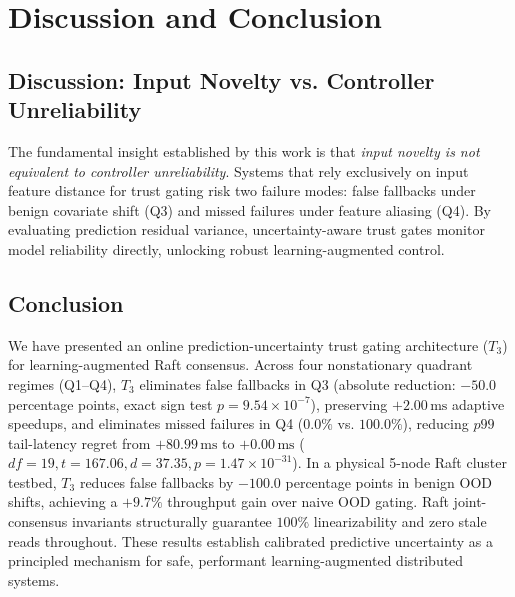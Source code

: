 \section{Discussion and Conclusion}
\label{sec:conclusion}

\subsection{Discussion: Input Novelty vs. Controller Unreliability}
The fundamental insight established by this work is that \emph{input novelty is not equivalent to controller unreliability}. Systems that rely exclusively on input feature distance for trust gating risk two failure modes: false fallbacks under benign covariate shift (Q3) and missed failures under feature aliasing (Q4). By evaluating prediction residual variance, uncertainty-aware trust gates monitor model reliability directly, unlocking robust learning-augmented control.

\subsection{Conclusion}
We have presented an online prediction-uncertainty trust gating architecture ($T_3$) for learning-augmented Raft consensus. Across four nonstationary quadrant regimes (Q1--Q4), $T_3$ eliminates false fallbacks in Q3 (absolute reduction: $-50.0$ percentage points, exact sign test $p = 9.54 \times 10^{-7}$), preserving $+2.00\,\text{ms}$ adaptive speedups, and eliminates missed failures in Q4 ($0.0\%$ vs. $100.0\%$), reducing $p99$ tail-latency regret from $+80.99\,\text{ms}$ to $+0.00\,\text{ms}$ ($df=19, t = 167.06, d = 37.35, p = 1.47 \times 10^{-31}$). In a physical 5-node Raft cluster testbed, $T_3$ reduces false fallbacks by $-100.0$ percentage points in benign OOD shifts, achieving a $+9.7\%$ throughput gain over naive OOD gating. Raft joint-consensus invariants structurally guarantee $100\%$ linearizability and zero stale reads throughout. These results establish calibrated predictive uncertainty as a principled mechanism for safe, performant learning-augmented distributed systems.
